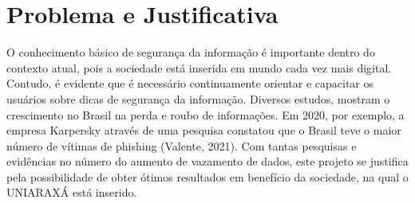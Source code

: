 \section{Problema e Justificativa}
\label{justificativa}

 O conhecimento básico de segurança da informação é importante dentro do
contexto atual, pois a sociedade está inserida em mundo cada vez mais digital. Contudo,
é evidente que é necessário continuamente orientar e capacitar os usuários sobre dicas
de segurança da informação.
Diversos estudos, mostram o crescimento no Brasil na perda e roubo de
informações. Em 2020, por exemplo, a empresa Karpersky através de uma pesquisa
constatou que o Brasil teve o maior número de vítimas de phishing (Valente, 2021).
Com tantas pesquisas e evidências no número do aumento de vazamento de
dados, este projeto se justifica pela possibilidade de obter ótimos resultados em benefício
da sociedade, na qual o UNIARAXÁ está inserido.